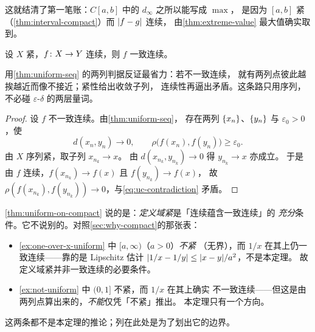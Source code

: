 这就结清了第一笔账：\(C[a,b]\) 中的 \(d_{\infty}\) 之所以能写成 \(\max\)，
是因为 \([a,b]\) 紧（\cref{thm:interval-compact}）而 \(\lvert f-g\rvert\) 连续，
由\cref{thm:extreme-value} 最大值确实取到。

\begin{theorem}[一致连续定理]
  \label{thm:uniform-on-compact}
  设 \(X\) 紧，\(f \colon X \to Y\) 连续，则 \(f\) 一致连续。
\end{theorem}

\begin{strategy}
  用\cref{thm:uniform-seq} 的两列判据反证最省力：若不一致连续，
  就有两列点彼此越挨越近而像不接近；紧性给出收敛子列，
  连续性再逼出矛盾。这条路只用序列，不必碰 \(\varepsilon\)-\(\delta\) 的两层量词。
\end{strategy}

\begin{proof}
  设 \(f\) 不一致连续。由\cref{thm:uniform-seq}，
  存在两列 \(\{x_{n}\}\)、\(\{y_{n}\}\) 与 \(\varepsilon_{0}>0\)，使
  \begin{equation}
    \label{eq:uc-contradiction}
    d(x_{n},y_{n}) \to 0, \qquad
    \rho\bigl(f(x_{n}),f(y_{n})\bigr) \ge \varepsilon_{0} .
  \end{equation}
  由 \(X\) 序列紧，取子列 \(x_{n_{k}} \to x\)。
  由 \(d(x_{n_{k}},y_{n_{k}}) \to 0\) 得 \(y_{n_{k}} \to x\) 亦成立。
  于是由 \(f\) 连续，\(f(x_{n_{k}}) \to f(x)\) 且 \(f(y_{n_{k}}) \to f(x)\)，
  故 \(\rho(f(x_{n_{k}}),f(y_{n_{k}})) \to 0\)，与\cref{eq:uc-contradiction} 矛盾。
\end{proof}

\begin{remark}[边界，务必看清]
  \cref{thm:uniform-on-compact} 说的是：\emph{定义域紧}是「连续蕴含一致连续」的%
  \emph{充分}条件。它不说别的。对照\cref{sec:why-compact}的那张表：
  \begin{itemize}
    \item \cref{ex:one-over-x-uniform} 中 \([a,\infty)\)（\(a>0\)）\emph{不紧}
          （无界），而 \(1/x\) 在其上仍一致连续——靠的是 Lipschitz 估计
          \(\lvert1/x-1/y\rvert \le \lvert x-y\rvert/a^{2}\)，不是本定理。
          故定义域紧并非一致连续的必要条件。
    \item \cref{ex:not-uniform} 中 \((0,1]\) 不紧，而 \(1/x\) 在其上确实
          不一致连续——但这是由两列点算出来的，\emph{不能}仅凭「不紧」推出。
          本定理只有一个方向。
  \end{itemize}
  这两条都不是本定理的推论；列在此处是为了划出它的边界。
\end{remark}

